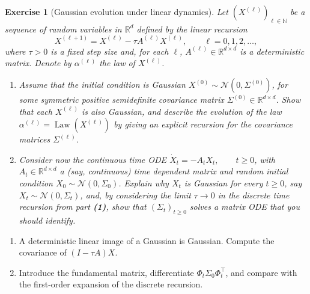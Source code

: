 \documentclass[11pt,a4paper]{article}
\theoremstyle{exostyle}
\newtheorem{exercise}{Exercise}
\newcommand{\R}{\mathbb{R}}
\begin{document}
\begin{exercise}[Gaussian evolution under linear dynamics]\label{ex:gaussian-linear-dynamics}
Let $(X^{(\ell)})_{\ell\in\mathbb{N}}$ be a sequence of random variables in $\R^d$ defined by the linear recursion
\[
X^{(\ell+1)} = X^{(\ell)} - \tau A^{(\ell)} X^{(\ell)}, \qquad \ell = 0,1,2,\dots,
\]
where $\tau>0$ is a fixed step size and, for each $\ell$, $A^{(\ell)}\in\R^{d\times d}$ is a deterministic matrix. Denote by $\alpha^{(\ell)}$ the law of $X^{(\ell)}$.

\begin{enumerate}[label=\textbf{(\arabic*)}]
  \item Assume that the initial condition is Gaussian
  $X^{(0)} \sim \mathcal{N}(0,\Sigma^{(0)})$,
  for some symmetric positive semidefinite covariance matrix $\Sigma^{(0)}\in\R^{d\times d}$. Show that each $X^{(\ell)}$ is also Gaussian, and describe the evolution of the law
  $\alpha^{(\ell)} = \operatorname{Law}(X^{(\ell)})$
  by giving an explicit recursion for the covariance matrices $\Sigma^{(\ell)}$.

  \item Consider now the continuous time ODE
  $\dot X_t = -A_t X_t, \qquad t\ge 0$,
  with $A_t\in\R^{d\times d}$ a (say, continuous) time dependent matrix and random initial condition
  $X_0 \sim \mathcal{N}(0,\Sigma_0)$.
  Explain why $X_t$ is Gaussian for every $t\ge 0$, say
  $X_t \sim \mathcal{N}(0,\Sigma_t)$,
  and, by considering the limit $\tau\to 0$ in the discrete time recursion from part \textbf{(1)}, show that $(\Sigma_t)_{t\ge 0}$ solves a matrix ODE that you should identify.
\end{enumerate}
\end{exercise}
\begin{hints}
\begin{enumerate}[label=(\arabic*)]\item A deterministic linear image of a Gaussian is Gaussian. Compute the covariance of $(I-\tau A)X$.\item Introduce the fundamental matrix, differentiate $\Phi_t\Sigma_0\Phi_t^\top$, and compare with the first-order expansion of the discrete recursion.\end{enumerate}
\end{hints}
\end{document}
